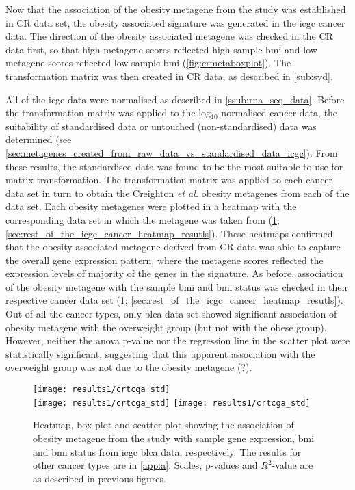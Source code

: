 \noindent
Now that the association of the obesity metagene from the \citet{Creighton2012} study was established in CR data set, the obesity associated signature was generated in the \gls{icgc} cancer data.
The direction of the obesity associated metagene was checked in the CR data first, so that high metagene scores reflected high sample \gls{bmi} and low metagene scores reflected low sample \gls{bmi} (\cref{fig:crmetaboxplot}).
The transformation matrix was then created in CR data, as described in \cref{sub:svd}.

All of the \gls{icgc} data were normalised as described in \cref{ssub:rna_seq_data}.
Before the transformation matrix was applied to the log$_{10}$-normalised cancer data, the suitability of standardised data or untouched (non-standardised) data was determined (see \cref{sec:metagenes_created_from_raw_data_vs_standardised_data_icgc}).
From these results, the standardised data was found to be the most suitable to use for matrix transformation.
The transformation matrix was applied to each cancer data set in turn to obtain the Creighton \textit{et al.} obesity metagenes from each of the data set.
Each obesity metagenes were plotted in a heatmap with the corresponding data set in which the metagene was taken from (\cref{fig:crmetaicgc}; \cref{sec:rest_of_the_icgc_cancer_heatmap_resutls}).
These heatmaps confirmed that the obesity associated metagene derived from CR data was able to capture the overall gene expression pattern, where the metagene scores reflected the expression levels of majority of the genes in the signature.
As before, association of the obesity metagene with the sample \gls{bmi} and \gls{bmi} status was checked in their respective cancer data set (\cref{fig:crmetaicgc}; \cref{sec:rest_of_the_icgc_cancer_heatmap_resutls}).
Out of all the cancer types, only \gls{blca} data set showed significant association of obesity metagene with the overweight group (but not with the obese group).
However, neither the \gls{anova} p-value nor the regression line in the scatter plot were statistically significant, suggesting that this apparent association with the overweight group was not due to the obesity metagene (?).

\begin{figure}[htp!]
	\centering
	\texttt{[image: results1/crtcga\_std]}\\
	\vspace{1em}
	\texttt{[image: results1/crtcga\_std]}
	\hfill
	\texttt{[image: results1/crtcga\_std]}
	\caption[Obesity metagene from the \citet{Creighton2012} study in \acrshort{icgc} \acrshort{blca} data]{Heatmap, box plot and scatter plot showing the association of obesity metagene from the \citet{Creighton2012} study with sample gene expression, \gls{bmi} and \gls{bmi} status from \gls{icgc} \gls{blca} data, respectively.
	The results for other cancer types are in \cref{app:a}.
	Scales, p-values and $R^2$-value are as described in previous figures.}
	\label{fig:crmetaicgc}
\end{figure}


